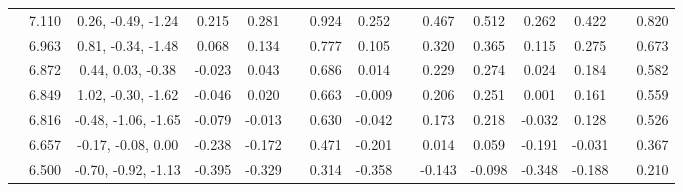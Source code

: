 \documentclass[prd,twocolumn,floatfix,nofootinbib]{revtex4}
\begin{document}
\begin{table*}[!htbp]
\begin{tabular}{c|cc|cccccccccccc}
                            &7.110  &0.26, -0.49, -1.24 &0.215 &0.281 & &0.924 &0.252 & &0.467 &0.512 &0.262 &0.422 & &0.820 \\
                            &6.963  &0.81, -0.34, -1.48 &0.068 &0.134 & &0.777 &0.105 & &0.320 &0.365 &0.115 &0.275 & &0.673 \\
                            &6.872  &0.44, 0.03, -0.38 &-0.023 &0.043 & &0.686 &0.014 & &0.229 &0.274 &0.024 &0.184 & &0.582 \\
                            &6.849  &1.02, -0.30, -1.62 &-0.046 &0.020 & &0.663 &-0.009 & &0.206 &0.251 &0.001 &0.161 & &0.559 \\
                            &6.816  &-0.48, -1.06, -1.65 &-0.079 &-0.013 & &0.630 &-0.042 & &0.173 &0.218 &-0.032 &0.128 & &0.526 \\
                            &6.657  &-0.17, -0.08, 0.00 &-0.238 &-0.172 & &0.471 &-0.201 & &0.014 &0.059 &-0.191 &-0.031 & &0.367 \\
                            &6.500  &-0.70, -0.92, -1.13 &-0.395 &-0.329 & &0.314 &-0.358 & &-0.143 &-0.098 &-0.348 &-0.188 & &0.210 \\
        \bottomrule[0.5pt]\bottomrule[1.5pt]
    \end{tabular}
\end{table*}
\end{document}
